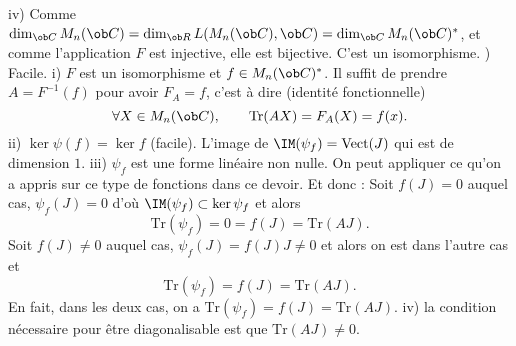 \medskip\noindent
iv) Comme $\dim_{\ob C}\sc M_n(\ob C)=\dim_{\ob R}\sc L(\sc M_n(\ob C),\ob C)=\dim_{\ob C}\sc M_n(\ob C)^*$, et comme l'application $F$ est injective, elle est bijective. C'est un isomorphisme. 
\medskip{}) Facile. 
\medskip
i) $F$ est un isomorphisme et $f\in\sc M_n(\ob C)^*$. Il suffit de prendre $A=F^{-1}(f)$ pour avoir $F_A=f$, c'est \`a dire (identit\'e fonctionnelle) 
$$
\forall X\in\sc M_n(\ob C), \qquad \mbox{Tr}(AX)=F_A(X)=f(x).
$$
ii) $\ker\psi(f)=\ker f$ (facile). L'image de $\IM(\psi_f)=\mbox{Vect}(J)$ qui est de dimension $1$. 
\medskip\noindent
iii) $\psi_f$ est une forme lin\'eaire non nulle. On peut appliquer ce qu'on a appris sur ce type de fonctions dans ce devoir. Et donc : \medskip\noindent
Soit $f(J)=0$ auquel cas, $\psi_f(J)=0$ d'o\`u $\IM(\psi_f)\subset\ker\psi_f$ et alors $$\mbox{Tr}(\psi_f)=0=f(J)=\mbox{Tr}(AJ).$$
Soit $f(J)\neq0$ auquel cas, $\psi_f(J)=f(J)J\neq0$ et alors on est dans l'autre cas et  $$\mbox{Tr}(\psi_f)=f(J)=\mbox{Tr}(AJ).$$
En fait, dans les deux cas, on a $\mbox{Tr}(\psi_f)=f(J)=\mbox{Tr}(AJ)$. \medskip\noindent
iv) la condition n\'ecessaire pour \^etre diagonalisable est que $\mbox{Tr}(AJ)\neq0$.
\bigski
